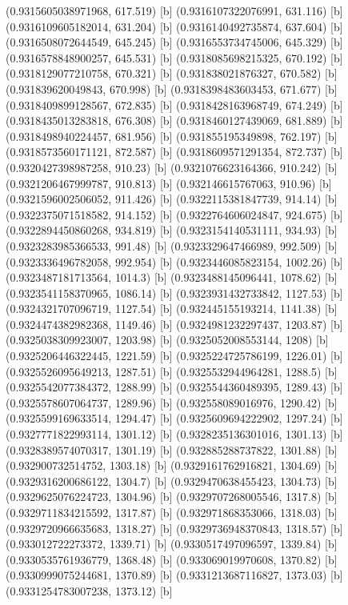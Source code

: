{{{(0.9315605038971968, 617.519) [b] 
(0.9316107322076991, 631.116) [b] 
(0.9316109605182014, 631.204) [b] 
(0.9316140492735874, 637.604) [b] 
(0.9316508072644549, 645.245) [b] 
(0.9316553734745006, 645.329) [b] 
(0.9316578848900257, 645.531) [b] 
(0.9318085698215325, 670.192) [b] 
(0.9318129077210758, 670.321) [b] 
(0.931838021876327, 670.582) [b] 
(0.931839620049843, 670.998) [b] 
(0.9318398483603453, 671.677) [b] 
(0.9318409899128567, 672.835) [b] 
(0.9318428163968749, 674.249) [b] 
(0.9318435013283818, 676.308) [b] 
(0.9318460127439069, 681.889) [b] 
(0.9318498940224457, 681.956) [b] 
(0.931855195349898, 762.197) [b] 
(0.9318573560171121, 872.587) [b] 
(0.9318609571291354, 872.737) [b] 
(0.9320427398987258, 910.23) [b] 
(0.9321076623164366, 910.242) [b] 
(0.9321206467999787, 910.813) [b] 
(0.932146615767063, 910.96) [b] 
(0.9321596002506052, 911.426) [b] 
(0.9322115381847739, 914.14) [b] 
(0.9322375071518582, 914.152) [b] 
(0.9322764606024847, 924.675) [b] 
(0.9322894450860268, 934.819) [b] 
(0.9323154140531111, 934.93) [b] 
(0.9323283985366533, 991.48) [b] 
(0.9323329647466989, 992.509) [b] 
(0.9323336496782058, 992.954) [b] 
(0.9323446085823154, 1002.26) [b] 
(0.9323487181713564, 1014.3) [b] 
(0.9323488145096441, 1078.62) [b] 
(0.9323541158370965, 1086.14) [b] 
(0.9323931432733842, 1127.53) [b] 
(0.9324321707096719, 1127.54) [b] 
(0.932445155193214, 1141.38) [b] 
(0.9324474382982368, 1149.46) [b] 
(0.9324981232297437, 1203.87) [b] 
(0.9325038309923007, 1203.98) [b] 
(0.9325052008553144, 1208) [b] 
(0.9325206446322445, 1221.59) [b] 
(0.9325224725786199, 1226.01) [b] 
(0.9325526095649213, 1287.51) [b] 
(0.9325532944964281, 1288.5) [b] 
(0.9325542077384372, 1288.99) [b] 
(0.9325544360489395, 1289.43) [b] 
(0.9325578607064737, 1289.96) [b] 
(0.932558089016976, 1290.42) [b] 
(0.9325599169633514, 1294.47) [b] 
(0.9325609694222902, 1297.24) [b] 
(0.9327771822993114, 1301.12) [b] 
(0.9328235136301016, 1301.13) [b] 
(0.9328389574070317, 1301.19) [b] 
(0.932885288737822, 1301.88) [b] 
(0.932900732514752, 1303.18) [b] 
(0.9329161762916821, 1304.69) [b] 
(0.9329316200686122, 1304.7) [b] 
(0.9329470638455423, 1304.73) [b] 
(0.9329625076224723, 1304.96) [b] 
(0.9329707268005546, 1317.8) [b] 
(0.9329711834215592, 1317.87) [b] 
(0.932971868353066, 1318.03) [b] 
(0.9329720966635683, 1318.27) [b] 
(0.9329736948370843, 1318.57) [b] 
(0.933012722273372, 1339.71) [b] 
(0.9330517497096597, 1339.84) [b] 
(0.9330535761936779, 1368.48) [b] 
(0.933069019970608, 1370.82) [b] 
(0.9330999075244681, 1370.89) [b] 
(0.9331213687116827, 1373.03) [b] 
(0.9331254783007238, 1373.12) [b] 
}}}
